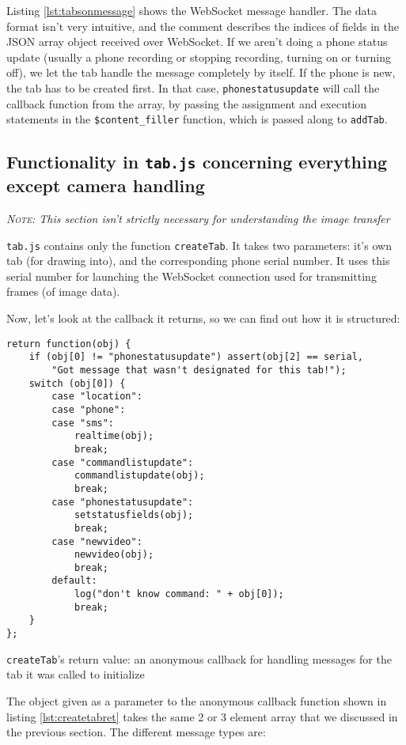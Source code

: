 \documentclass[a4paper]{report}
\newcommand{\methodname}[1]{\texttt{#1}}
\newcommand{\variable}[1]{\texttt{#1}}
\newcommand{\filename}[1]{\texttt{#1}}
\begin{document}
{Listing \ref{lst:tabsonmessage} shows the WebSocket message handler. The data format isn't very intuitive, and the comment describes the indices of fields in the JSON array object received over WebSocket. If we aren't doing a phone status update (usually a phone recording or stopping recording, turning on or turning off), we let the tab handle the message completely by itself. If the phone is new, the tab has to be created first. In that case, \methodname{phonestatusupdate} will call the callback function from the array, by passing the assignment and execution statements in the \variable{\$content\_filler} function, which is passed along to \methodname{addTab}.

\subsection{Functionality in \filename{tab.js} concerning everything except camera handling}
\textit{\textsc{Note:} This section isn't strictly necessary for understanding the image transfer}

\filename{tab.js} contains only the function \methodname{createTab}. It takes two parameters: it's own tab (for drawing into), and the corresponding phone serial number. It uses this serial number for launching the WebSocket connection used for transmitting frames (of image data).

Now, let's look at the callback it returns, so we can find out how it is structured:
\begin{listing}[H]
\begin{verbatim}
return function(obj) {
	if (obj[0] != "phonestatusupdate") assert(obj[2] == serial, 
		"Got message that wasn't designated for this tab!");
	switch (obj[0]) {
		case "location":
		case "phone":
		case "sms":
			realtime(obj);
			break;
		case "commandlistupdate":
			commandlistupdate(obj);
			break;
		case "phonestatusupdate":
			setstatusfields(obj);
			break;
		case "newvideo":
			newvideo(obj);
			break;
		default:
			log("don't know command: " + obj[0]);
			break;
	}
};
\end{verbatim}
\caption{\methodname{createTab}'s return value: an anonymous callback for handling messages for the tab it was called to initialize}
\label{lst:createtabret}
\end{listing}

The object given as a parameter to the anonymous callback function shown in listing \ref{lst:createtabret} takes the same 2 or 3 element array that we discussed in the previous section. The different message types are:
}
\end{document}
